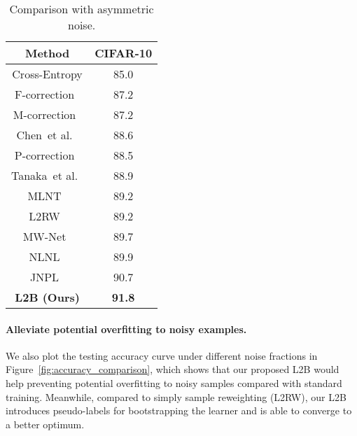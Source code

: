 \documentclass{article}
\begin{document}
\begin{table}[tbh!]
        \centering
        \footnotesize
        \caption{Comparison with asymmetric noise.}
        \vspace{-.5em}
        \begin{tabular}[b]{|c|c|}
                \hline
                Method   &CIFAR-10   \\
                 \hline
                Cross-Entropy &85.0 \\
                F-correction~\cite{patrini2017making}  &87.2 \\
                M-correction~\cite{arazo2019unsupervised} &87.2     \\
                Chen~et al.~\cite{chen2019understanding} &88.6    \\
                P-correction~\cite{yi2019probabilistic} &88.5    \\
                Tanaka~et al.~\cite{tanaka2018joint} &88.9    \\
                MLNT~\cite{li2019learning} &89.2    \\
                L2RW~\cite{ren2018learning} &89.2    \\
                MW-Net~\cite{shu2019meta} &89.7 \\
                NLNL~\cite{kim2019nlnl} &89.9 \\
                JNPL~\cite{Kim_2021_CVPR} &90.7 \\
                \hline
                \textbf{L2B (Ours)} & \textbf{91.8}    \\
                \hline
        \end{tabular}
        \label{tab:aymmetric_noise}
        \vspace{-.5em}
 \end{table}    



\paragraph{Alleviate potential overfitting to noisy examples.} We also plot the testing accuracy curve under different noise fractions in Figure~\ref{fig:accuracy_comparison}, which shows that our proposed L2B would help preventing potential overfitting to noisy samples compared with standard training.
Meanwhile, compared to simply sample reweighting (L2RW), our L2B introduces pseudo-labels for bootstrapping the learner and is able to converge to a better optimum.
\end{document}

